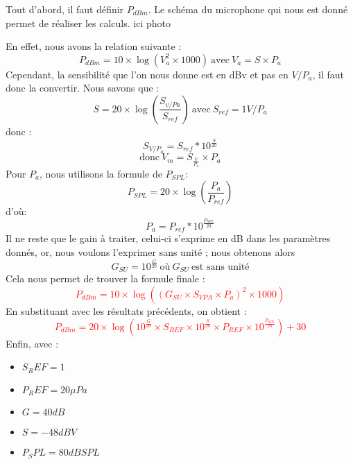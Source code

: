 Tout d'abord, il faut définir $P_{dBm}$. Le schéma du microphone qui nous est donné permet de réaliser les calculs.
%
ici photo
%

En effet, nous avons la relation suivante :
\begin{equation}
P_{dBm} = 10 \times \log(V_a^2 \times 1000) \ \text{avec}\ V_a = S \times P_a
\end{equation}
Cependant, la sensibilité que l'on nous donne est en dBv et pas en $V/P_a$, il faut donc la convertir. Nous savons que :\begin{equation}
    S = 20\times \log(\frac{S_{v/Pa}}{S_{ref}}) \ \text{avec}\  S_{ref} = 1 V/P_a
\end{equation} donc :
\begin{equation}
   S_{V/P_a} = S_{ref}*10^\frac{S}{20} 
\end{equation}
\begin{equation}
    \text{donc}\ V_m = S_{\frac{V}{P_a}} \times P_a
\end{equation} 
Pour $P_a$, nous utilisons la formule de $P_{SPL}$: 
\begin{equation}
    P_{SPL} = 20\times \log(\frac{P_a}{P_{ref}}) 
\end{equation}
d'où:
\begin{equation}
P_a = P_{ref} * 10^{\frac{P_{SPL}}{20}}
\end{equation}
Il ne reste que le gain à traiter, celui-ci s'exprime en dB dans les paramètres donnés, or, nous voulons l'exprimer sans unité ; nous obtenons alors 
\begin{equation}
    G_{SU} = 10^\frac{G}{20} \ \text{où} \ G_{SU} \ \text{est sans unité}
\end{equation}
Cela nous permet de trouver la formule finale : 
\textcolor{red}{
\begin{equation}
    P_{dBm} = 10 \times \log((G_{SU} \times S_{VPA} \times P_a)^2 \times 1000)
\end{equation}
}
En substituant avec les résultats précédents, on obtient :
\textcolor{red}{
\begin{equation}
    P_{dBm} = 20 \times \log(10^\frac{G}{20} \times S_{REF} \times 10^{\frac{S}{20}} \times P_{REF} \times 10^{\frac{P_{SPL}}{20}})+30
\end{equation}
}
Enfin, avec : \begin{itemize}
    \item $S_REF = 1$
    \item $P_REF = 20 \mu Pa$
    \item $G = 40 dB$
    \item $S = -48 dBV$
    \item $P_SPL = 80 dB SPL$
\end{itemize} 
